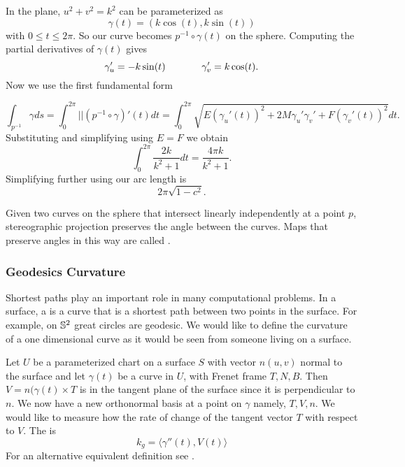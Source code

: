 \begin{example}
In the plane, $u^2+v^2=k^2$ can be parameterized
as $$\gamma(t)=(k\cos(t),k\sin(t))$$ with $0\leq t\leq 2\pi.$
So our curve becomes $p^{-1}\circ \gamma(t)$ on the sphere.
Computing the partial derivatives of $\gamma(t)$ gives
$$\gamma_u'=-k\sin(t)\hspace{1.3cm}  \gamma_v'=k\cos(t).$$
Now we use the first fundamental form

$$\int_{p^{-1}}\gamma ds=\int_{0}^{2\pi} ||(p^{-1}\circ \gamma)'(t)dt=\int_0^{2\pi}\sqrt{E(\gamma_u'(t))^2+2M\gamma_u'\gamma_v'+
F(\gamma_v'(t))^2}dt.$$
Substituting and simplifying using $E=F$ we obtain
$$\int_0^{2\pi}\frac{2k}{k^2+1}dt=\frac{4\pi k}{k^2+1}.$$
Simplifying further using   our arc length is
$$2\pi\sqrt{1-c^2}.$$

\end{example}



Given two curves on the sphere that intersect linearly independently at a point $p$, 
stereographic projection preserves the angle between the curves.
Maps that preserve angles in this way are called .

\subsubsection{Geodesics Curvature}

Shortest paths play an important role in many computational problems.
In a surface, a  is a curve that is a shortest path
between two points in the surface. 
For example, on $\mathbb{S}^2$ great circles are geodesic.
We would like to define the curvature of a one dimensional curve as it would
 be seen from someone living on a surface.

Let $U$ be a parameterized chart on a surface $S$ with vector $n(u,v)$ normal
to the surface
and let $\gamma(t)$ be a curve in $U$, with Frenet frame $T,N,B$.
Then $V=n(\gamma(t)\times T$ is in the tangent plane of the surface since
it is perpendicular to $n$. We now have a new orthonormal basis at a point on $\gamma$
namely, $T,V,n$. 
We would like to measure how the rate of change of the tangent vector $T$ with respect to $V$.
The  is  
\begin{equation} \label{eqn:geodesic}
	k_g=\langle \gamma''(t),V(t)\rangle
\end{equation}
For an alternative equivalent definition see \cite{doc76}.



